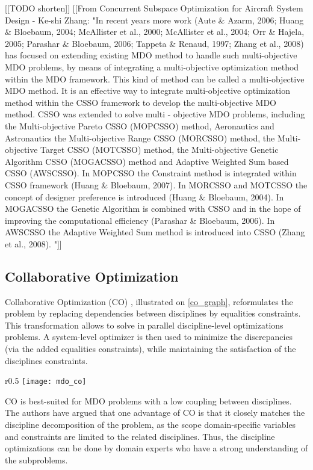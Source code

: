 [[TODO shorten]]
[[From Concurrent Subspace Optimization for Aircraft System Design -  Ke-shi Zhang:
"In recent years more work (Aute \& Azarm, 2006; Huang \& Bloebaum, 2004; McAllister et al., 2000; McAllister et al., 2004; Orr \& Hajela, 2005; Parashar \& Bloebaum, 2006; Tappeta \& Renaud, 1997; Zhang et al., 2008) has focused on extending existing MDO method to handle such multi-objective MDO problems, by means of integrating a multi-objective optimization method within the MDO framework. This kind of method can be called a multi-objective MDO method.
It is an effective way to integrate multi-objective optimization method within the CSSO framework to develop the multi-objective MDO method. CSSO was extended to solve multi - objective MDO problems, including the Multi-objective Pareto CSSO (MOPCSSO) method, Aeronautics and Astronautics the Multi-objective Range CSSO (MORCSSO) method, the Multi-objective Target CSSO (MOTCSSO) method, the Multi-objective Genetic Algorithm CSSO (MOGACSSO) method and Adaptive Weighted Sum based CSSO (AWSCSSO). In MOPCSSO the Constraint method is integrated within CSSO framework (Huang \& Bloebaum, 2007). In MORCSSO and MOTCSSO the concept of designer preference is introduced (Huang \& Bloebaum, 2004). In MOGACSSO the Genetic Algorithm is combined with CSSO and in the hope of improving the computational efficiency (Parashar \& Bloebaum, 2006). In AWSCSSO the Adaptive Weighted Sum method is introduced into CSSO (Zhang et al., 2008). "]]

\subsection{Collaborative Optimization}

Collaborative Optimization (CO) \cite{Ilan:1994:MOM:887207}, illustrated on \figurename{} \ref{co_graph}, reformulates the problem by replacing dependencies between disciplines by equalities constraints. This transformation allows to solve in parallel discipline-level optimizations problems. A system-level optimizer is then used to minimize the discrepancies (via the added equalities constraints), while maintaining the satisfaction of the disciplines constraints.

\begin{wrapfigure}{r}{0.5\textwidth}
\centering
\texttt{[image: mdo\_co]}
\caption{CO method}\label{co_graph}
\end{wrapfigure}

CO is best-suited for MDO problems with a low coupling between disciplines. The authors have argued that one advantage of CO is that it closely matches the discipline decomposition of the problem, as the scope domain-specific variables and constraints are limited to the related disciplines. Thus, the discipline optimizations can be done by domain experts  who have a strong understanding of the subproblems.

